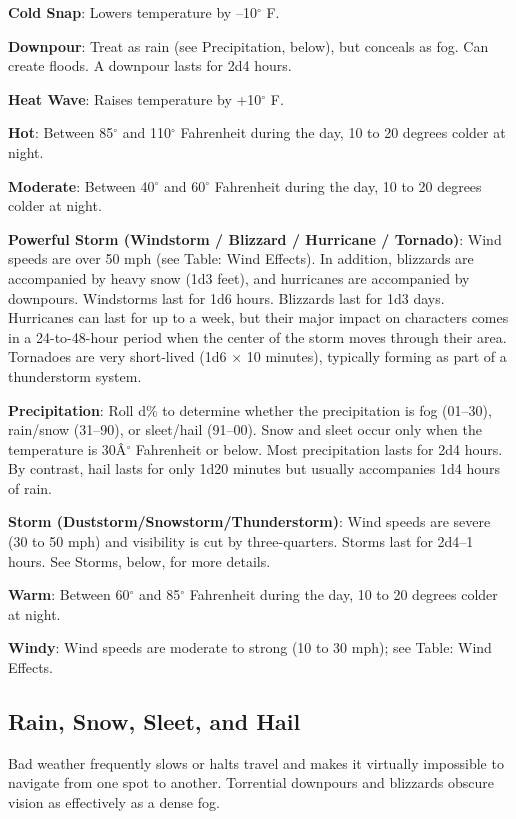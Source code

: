 \textbf{Cold Snap}: Lowers temperature by --10\mbox{${}^\circ$} F.
				
\textbf{Downpour}: Treat as rain (see Precipitation, below), but conceals as fog. Can create floods. A downpour lasts for 2d4 hours.
				
\textbf{Heat Wave}: Raises temperature by +10\mbox{${}^\circ$} F.
				
\textbf{Hot}: Between 85\mbox{${}^\circ$} and 110\mbox{${}^\circ$} Fahrenheit during the day, 10 to 20 degrees colder at night.
				
\textbf{Moderate}: Between 40\mbox{${}^\circ$} and 60\mbox{${}^\circ$} Fahrenheit during the day, 10 to 20 degrees colder at night.
				
\textbf{Powerful Storm (Windstorm / Blizzard / Hurricane / Tornado)}: Wind speeds are over 50 mph (see Table: Wind Effects). In addition, blizzards are accompanied by heavy snow (1d3 feet), and hurricanes are accompanied by downpours. Windstorms last for 1d6 hours. Blizzards last for 1d3 days. Hurricanes can last for up to a week, but their major impact on characters comes in a 24-to-48-hour period when the center of the storm moves through their area. Tornadoes are very short-lived (1d6 \mbox{$\times$} 10 minutes), typically forming as part of a thunderstorm system. 
				
\textbf{Precipitation}: Roll d\% to determine whether the precipitation is fog (01--30), rain/snow (31--90), or sleet/hail (91--00). Snow and sleet occur only when the temperature is 30\^A\mbox{${}^\circ$} Fahrenheit or below. Most precipitation lasts for 2d4 hours. By contrast, hail lasts for only 1d20 minutes but usually accompanies 1d4 hours of rain.
				
\textbf{Storm (Duststorm/Snowstorm/Thunderstorm)}: Wind speeds are severe (30 to 50 mph) and visibility is cut by three-quarters. Storms last for 2d4--1 hours. See Storms, below, for more details. 
				
\textbf{Warm}: Between 60\mbox{${}^\circ$} and 85\mbox{${}^\circ$} Fahrenheit during the day, 10 to 20 degrees colder at night.
				
\textbf{Windy}: Wind speeds are moderate to strong (10 to 30 mph); see Table: Wind Effects.
				
\subsection{Rain, Snow, Sleet, and Hail}

				
Bad weather frequently slows or halts travel and makes it virtually impossible to navigate from one spot to another. Torrential downpours and blizzards obscure vision as effectively as a dense fog.
				
